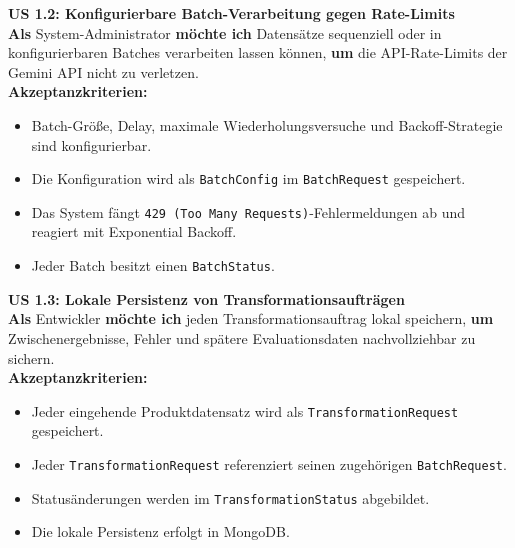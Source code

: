 \documentclass[11pt,a4paper]{article}
\begin{document}
\noindent\colorbox{usgray}{%
\begin{minipage}{\dimexpr\textwidth-2\fboxsep\relax}
\textbf{\textcolor{usblue}{US 1.2: Konfigurierbare Batch-Verarbeitung gegen Rate-Limits}} \\[0.5em]
\textbf{Als} System-Administrator \textbf{möchte ich} Datensätze sequenziell oder in konfigurierbaren Batches verarbeiten lassen können, \textbf{um} die API-Rate-Limits der Gemini API nicht zu verletzen.\\[0.5em]
\textbf{Akzeptanzkriterien:}
\begin{itemize}[leftmargin=*, parsep=0pt, topsep=0pt, itemsep=2pt]
    \item Batch-Größe, Delay, maximale Wiederholungsversuche und Backoff-Strategie sind konfigurierbar.
    \item Die Konfiguration wird als \texttt{BatchConfig} im \texttt{BatchRequest} gespeichert.
    \item Das System fängt \texttt{429 (Too Many Requests)}-Fehlermeldungen ab und reagiert mit Exponential Backoff.
    \item Jeder Batch besitzt einen \texttt{BatchStatus}.
\end{itemize}
\end{minipage}}
\vspace{1em}

\noindent\colorbox{usgray}{%
\begin{minipage}{\dimexpr\textwidth-2\fboxsep\relax}
\textbf{\textcolor{usblue}{US 1.3: Lokale Persistenz von Transformationsaufträgen}} \\[0.5em]
\textbf{Als} Entwickler \textbf{möchte ich} jeden Transformationsauftrag lokal speichern, \textbf{um} Zwischenergebnisse, Fehler und spätere Evaluationsdaten nachvollziehbar zu sichern.\\[0.5em]
\textbf{Akzeptanzkriterien:}
\begin{itemize}[leftmargin=*, parsep=0pt, topsep=0pt, itemsep=2pt]
    \item Jeder eingehende Produktdatensatz wird als \texttt{TransformationRequest} gespeichert.
    \item Jeder \texttt{TransformationRequest} referenziert seinen zugehörigen \texttt{BatchRequest}.
    \item Statusänderungen werden im \texttt{TransformationStatus} abgebildet.
    \item Die lokale Persistenz erfolgt in MongoDB.
\end{itemize}
\end{minipage}}
\vspace{1em}
\end{document}
